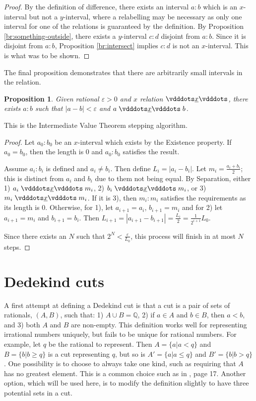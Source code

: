\documentclass[12pt]{article}
\newtheorem{proposition}{Proposition}[section]
\begin{document}
\begin{proof}
    By the definition of difference, there exists an interval $a:b$ which is an $x$-interval but not a $y$-interval, where a relabelling may be necessary as only one interval for one of the relations is guaranteed by the definition. By Proposition \ref{br:something-outside}, there exists a $y$-interval $c:d$ disjoint from $a:b$. Since it is disjoint from $a:b$, Proposition \ref{br:intersect} implies $c:d$ is not an $x$-interval. This is what was to be shown. 
\end{proof}


The final proposition demonstrates that there are arbitrarily small intervals in the relation. 

\begin{proposition}
    Given rational $\varepsilon >0$ and $x$ relation $\xrel$, there exists $a:b$ such that $|a-b| < \varepsilon$ and $a \xrel b$. 
\end{proposition}

This is the Intermediate Value Theorem stepping algorithm. 

\begin{proof}
    Let $a_0:b_0$ be an $x$-interval which exists by the Existence property. If $a_0 = b_0$, then the length is 0 and $a_0:b_0$ satisfies the result. 
    
    Assume $a_i:b_i$ is defined and $a_i \neq b_i$. Then define $L_i = |a_i - b_i|$. Let $m_i = \frac{a_i + b_i}{2}$; this is distinct from $a_i$ and $b_i$ due to them not being equal. By Separation, either 1) $a_i \xrel m_i$, 2) $b_i \xrel m_i$, or 3) $m_i \xrel m_i$. If it is 3), then $m_i:m_i$ satisfies the requirements as its length is 0. Otherwise, for 1), let $a_{i+1}= a_i$, $b_{i+1} = m_i$ and for 2) let $a_{i+1} = m_i$ and $b_{i+1} = b_i$. Then $L_{i+1} = |a_{i+1} - b_{i+1}| = \frac{L_i}{2} = \frac{1}{2^{i+1}} L_0 $. 

    Since there exists an $N$ such that $2^N < \frac{\varepsilon}{L_0}$, this process will finish in at most $N$ steps. 

    
\end{proof}




\section{Dedekind cuts}

A first attempt at defining a Dedekind cut is that a cut is a pair of sets of rationals, $(A, B)$, such that: 1) $A \cup B = \mathbb{Q}$, 2) if $a \in A$ and $b \in B$, then $a < b$, and 3) both $A$ and $B$ are non-empty. This definition works well for representing irrational numbers uniquely, but fails to be unique for rational numbers. For example, let $q$ be the rational to represent. Then $A = \{a | a < q\}$ and $B= \{b | b \geq q\}$ is a cut representing $q$, but so is  $A' = \{a | a \leq q\}$ and $B'= \{b | b > q\}$. One possibility is to choose to always take one kind, such as requiring that $A$ has no greatest element. This is a common choice such as in \cite{rudin}, page 17. Another option, which will be used here, is to modify the definition slightly to have three potential sets in a cut.
\end{document}
